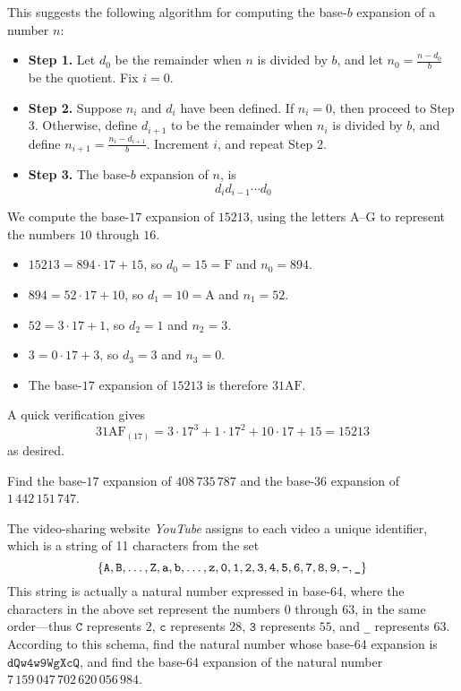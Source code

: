 This suggests the following algorithm for computing the base-$b$ expansion of a number $n$:
\begin{itemize}
\item \textbf{Step 1.} Let $d_0$ be the remainder when $n$ is divided by $b$, and let $n_0=\frac{n-d_0}{b}$ be the quotient. Fix $i=0$.
\item \textbf{Step 2.} Suppose $n_i$ and $d_i$ have been defined. If $n_i=0$, then proceed to Step 3. Otherwise, define $d_{i+1}$ to be the remainder when $n_i$ is divided by $b$, and define $n_{i+1} = \frac{n_i-d_{i+1}}{b}$. Increment $i$, and repeat Step 2.
\item \textbf{Step 3.} The base-$b$ expansion of $n$, is
\[ d_id_{i-1} \cdots d_0 \]
\end{itemize}

\begin{example}
We compute the base-$17$ expansion of $15213$, using the letters $\mathrm{A}$--$\mathrm{G}$ to represent the numbers $10$ through $16$.
\begin{itemize}
\item $15213 = 894 \cdot 17 + 15$, so $d_0=15=\mathrm{F}$ and $n_0=894$.
\item $894 = 52 \cdot 17 + 10$, so $d_1=10 = \mathrm{A}$ and $n_1=52$.
\item $52 = 3 \cdot 17 + 1$, so $d_2 = 1$ and $n_2=3$.
\item $3 = 0 \cdot 17 + 3$, so $d_3 = 3$ and $n_3=0$.
\item The base-$17$ expansion of $15213$ is therefore $31\mathrm{AF}$.
\end{itemize}
A quick verification gives
\[ 31\mathrm{AF}_{(17)} = 3 \cdot 17^3 + 1 \cdot 17^2 + 10 \cdot 17 + 15 = 15213 \]
as desired.
\end{example}

\begin{exercise}
Find the base-$17$ expansion of $408\,735\,787$ and the base-$36$ expansion of $1\,442\,151\,747$.
\end{exercise}

\begin{exercise}
The video-sharing website \textit{YouTube} assigns to each video a unique identifier, which is a string of 11 characters from the set
\[ \{ \mathtt{A}, \mathtt{B}, \dots, \mathtt{Z}, \mathtt{a}, \mathtt{b}, \dots, \mathtt{z}, \mathtt{0}, \mathtt{1}, \mathtt{2}, \mathtt{3}, \mathtt{4}, \mathtt{5}, \mathtt{6}, \mathtt{7}, \mathtt{8}, \mathtt{9}, \text{\texttt{-}}, \text{\texttt{\_}} \} \]
This string is actually a natural number expressed in base-64, where the characters in the above set represent the numbers $0$ through $63$, in the same order---thus $\mathtt{C}$ represents $2$, $\mathtt{c}$ represents $28$, $\mathtt{3}$ represents $55$, and \texttt{\_} represents $63$. According to this schema, find the natural number whose base-64 expansion is $\mathtt{dQw4w9WgXcQ}$, and find the base-64 expansion of the natural number $7\,159\,047\,702\,620\,056\,984$.
\end{exercise}

